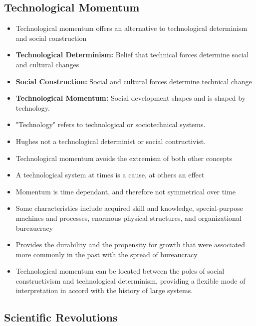\documentclass[11pt]{article}
\begin{document}
\subsection{Technological Momentum}
\begin{itemize}
\item Technological momentum offers an alternative to technological determinism and social construction
\item \textbf{Technological Determinism:} Belief that technical forces determine social and cultural changes
\item \textbf{Social Construction:} Social and cultural forces determine technical change
\item \textbf{Technological Momentum:} Social development shapes and is shaped by technology.
\item "Technology" refers to technological or sociotechnical systems.
\item Hughes not a technological determinist or social contructivist.
\item Technological momentum avoids the extremism of both other concepts
\item A technological system at times is a cause, at others an effect
\item Momentum is time dependant, and therefore not symmetrical over time
\item Some characteristics include acquired skill and knowledge, special-purpose machines and processes, enormous physical structures, and organizational bureaucracy
\item Provides the durability and the propensity for growth that were associated more commonly in the past with the spread of bureaucracy
\item Technological momentum can be located between the poles of social constructivism and technological determinism, providing a flexible mode of interpretation in accord with the history of large systems. 

\end{itemize}
\subsection{Scientific Revolutions}
\end{document}
